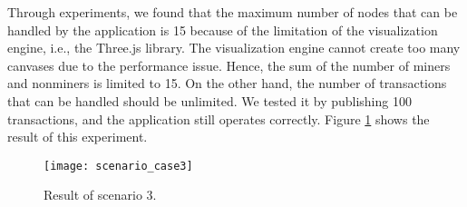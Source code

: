 Through experiments, we found that the maximum number of nodes that can be handled by the application is 15 because of the limitation of the visualization engine, i.e., the Three.js library. The visualization engine cannot create too many canvases due to the performance issue. Hence, the sum of the number of miners and nonminers is limited to 15. On the other hand, the number of transactions that can be handled should be unlimited. We tested it by publishing 100 transactions, and the application still operates correctly. Figure \ref{fig:result of scenario 3} shows the result of this experiment.

\begin{figure}[htb]
    \centering
    \texttt{[image: scenario\_case3]}
    \caption{Result of scenario 3.}
    \label{fig:result of scenario 3}
\end{figure}

